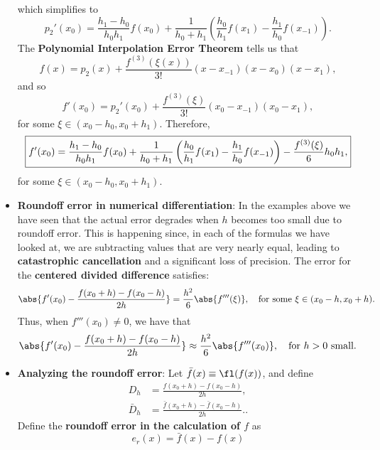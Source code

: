 \documentclass{report}
\begin{document}
\begin{itemize}
            which simplifies to
            $$p_2'(x_0) = 
            \frac{h_1-h_0}{h_0 h_1} f(x_0)  +
            \frac{1}{h_0+h_1}
            \left(
                \frac{h_0}{h_1} f(x_1) - \frac{h_1}{h_0} f(x_{-1})
            \right).$$
            \bigbreak \noindent 
            The \textbf{Polynomial Interpolation Error Theorem} tells us that
            $$f(x) = p_2(x) + \frac{f^{(3)}(\xi(x))}{3!}(x-x_{-1})(x-x_0)(x-x_1),$$
            and so 
            $$f'(x_0) = p_2'(x_0) + \frac{f^{(3)}(\xi)}{3!}(x_0 - x_{-1})(x_0 - x_1),$$
            for some $\xi \in (x_0 - h_0, x_0 + h_1)$.
            \bigbreak \noindent 
            Therefore,
            $$
            \fbox{$
                {\displaystyle
                    f'(x_0) = \frac{h_1-h_0}{h_0 h_1} f(x_0)  +
                    \frac{1}{h_0+h_1}
                    \left(
                        \frac{h_0}{h_1} f(x_1) - \frac{h_1}{h_0} f(x_{-1})
                    \right)
                    - \frac{f^{(3)}(\xi)}{6}h_0h_1,
                }
            $}
            $$
            for some $\xi \in (x_0 - h_0, x_0 + h_1)$.
        \item \textbf{Roundoff error in numerical differentiation}: In the examples above we have seen that the actual error degrades when $h$ becomes too small due to roundoff error.
            \bigbreak \noindent 
            This is happening since, in each of the formulas we have looked at, we are subtracting values that are very nearly equal, leading to \textbf{catastrophic cancellation} and a significant loss of precision.
            \bigbreak \noindent 
            The error for the \textbf{centered divided difference} satisfies:
            $$\abs{f'(x_0) -  \frac{f(x_0 + h) - f(x_0 - h)}{2h}} = \frac{h^2}{6}\abs{f'''(\xi)}, \quad \text{for some $\xi \in (x_0-h,x_0+h).$}$$
            Thus, when $f'''(x_0) \neq 0$, we have that
            $$\abs{f'(x_0) -  \frac{f(x_0 + h) - f(x_0 - h)}{2h}} \approx \frac{h^2}{6}\abs{f'''(x_0)}, \quad \text{for $h > 0$ small.}$$
        \item \textbf{Analyzing the roundoff error}:
            Let $\bar{f}(x) \equiv \fl(f(x))$, and define
            \begin{align*}
                D_h &= \frac{f(x_0 + h) - f(x_0 - h)}{2h}, \\
                \bar{D}_h &= \frac{\bar{f}(x_0 + h) - \bar{f}(x_0 - h)}{2h}.
            .\end{align*}
            Define the \textbf{roundoff error in the calculation of $f$} as
            $$e_r(x) = \bar{f}(x) - f(x)$$

\end{itemize}
\end{document}
